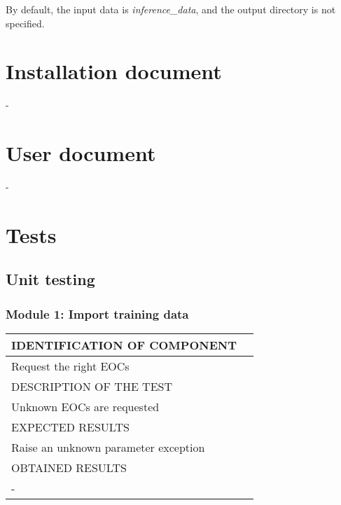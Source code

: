 \documentclass{polytech/polytech}
\numberwithin{figure}{chapter}
\begin{document}
\begin{appendix}
By default, the input data is {\it inference_data}, and the output directory is not specified.


\chapter{Installation document}

-

\chapter{User document}

-

\chapter{Tests}

\section{Unit testing}

\subsection{Module 1: Import training data}

\begin{table}[]
\begin{tabular}{|l|l|}\hline
\color{C} IDENTIFICATION OF COMPONENT \\\hline
Request the right EOCs  \\\hline
\color{C} DESCRIPTION OF THE TEST\\\hline
Unknown EOCs are requested \\\hline
\color{C} EXPECTED RESULTS \\\hline
Raise an unknown parameter exception \\\hline
\color{C} OBTAINED RESULTS \\\hline
- \\\hline
\end{tabular}
\end{table}


\end{appendix}
\end{document}
